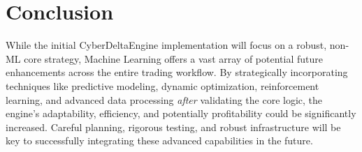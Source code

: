 \documentclass{article}
\begin{document}
\section{Conclusion}

While the initial CyberDeltaEngine implementation will focus on a robust, non-ML core strategy, Machine Learning offers a vast array of potential future enhancements across the entire trading workflow. By strategically incorporating techniques like predictive modeling, dynamic optimization, reinforcement learning, and advanced data processing \textit{after} validating the core logic, the engine's adaptability, efficiency, and potentially profitability could be significantly increased. Careful planning, rigorous testing, and robust infrastructure will be key to successfully integrating these advanced capabilities in the future.
\end{document}
